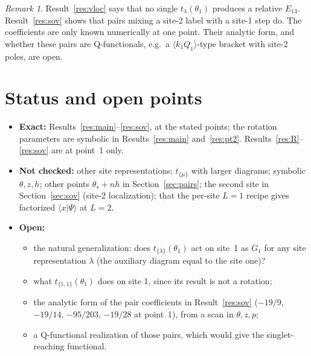 \documentclass[11pt]{article}
\theoremstyle{definition}
\theoremstyle{remark}
\newtheorem*{remark}{Remark}
\begin{document}
\begin{remark}
Result~\ref{res:vloc} says that no single $t_\lambda(\theta_1)$ produces a relative $E_{13}$. Result~\ref{res:sov} shows that pairs mixing a site-2 label with a site-1 step do. The coefficients are only known numerically at one point. Their analytic form, and whether these pairs are Q-functionals, e.g.\ a $\langle k_1Q_1\rangle$-type bracket with site-2 poles, are open.
\end{remark}

\section{Status and open points}
\begin{itemize}
\item \textbf{Exact:} Results~\ref{res:main}--\ref{res:sov}, at the stated points; the rotation parameters are symbolic in Results~\ref{res:main} and~\ref{res:pt2}. Results~\ref{res:R}--\ref{res:sov} are at point~1 only.
\item \textbf{Not checked:} other site representations; $t_{\{\mu\}}$ with larger diagrams; symbolic $\theta,z,h$; other points $\theta_s+nh$ in Section~\ref{sec:pairs}; the second site in Section~\ref{sec:sov} (site-2 localization); that the per-site $L=1$ recipe gives factorized $\langle x|\Psi\rangle$ at $L=2$.
\item \textbf{Open:}
  \begin{itemize}
  \item the natural generalization: does $t_{\{\lambda\}}(\theta_1)$ act on site~1 as $G_1$ for any site representation $\lambda$ (the auxiliary diagram equal to the site one)?
  \item what $t_{\{1,1\}}(\theta_1)$ does on site 1, since its result is not a rotation;
  \item the analytic form of the pair coefficients in Result~\ref{res:sov} ($-19/9$, $-19/14$, $-95/203$, $-19/28$ at point~1), from a scan in $\theta,z,p$;
  \item a Q-functional realization of those pairs, which would give the singlet-reaching functional.
  \end{itemize}
\end{itemize}
\end{document}
